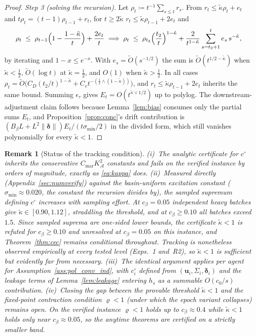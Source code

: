 \documentclass[11pt]{article}
\newtheorem{remark}[theorem]{Remark}
\newcommand{\Ot}{\widetilde{O}}
\begin{document}
\begin{proof}
\emph{Step 3 (solving the recursion).}  Let
$\rho_t\coloneqq t^{-1}\sum_{s\leq t}r_s$.  From
$r_t\leq\tilde\kappa\rho_t+e_t$ and
$t\rho_t=(t-1)\rho_{t-1}+r_t$, for $t\geq2\tilde\kappa$ $r_t\leq\tilde\kappa\rho_{t-1}+2e_t$ and
\[
\rho_t\;\leq\;\rho_{t-1}\Bigl(1-\frac{1-\tilde\kappa}{t}\Bigr)
+\frac{2e_t}{t}
\;\Longrightarrow\;
\rho_t\;\leq\;\rho_{t_2}\Bigl(\frac{t_2}{t}\Bigr)^{1-\tilde\kappa}
+\frac{2}{t^{1-\tilde\kappa}}\sum_{s=t_2+1}^{t}e_s\,s^{-\tilde\kappa},
\]
by iterating and $1-x\leq e^{-x}$.  With $e_s=\Ot(s^{-1/2})$ the sum is
$\Ot(t^{1/2-\tilde\kappa})$ when $\tilde\kappa<\tfrac12$,
$\Ot(\log t)$ at $\tilde\kappa=\tfrac12$, and $O(1)$ when
$\tilde\kappa>\tfrac12$. In all cases
$\rho_t=\Ot\bigl(C_D(t_2/t)^{1-\tilde\kappa}
+C_e t^{-(\frac12\wedge(1-\tilde\kappa))}\bigr)$, and
$r_t\leq\tilde\kappa\rho_{t-1}+2e_t$ inherits the same bound.  Summing
$\epsilon_\tau$ gives $E_t=O(t^{\tilde\kappa\vee1/2})$ up to polylog.
The downstream-adjustment claim follows because
Lemma~\ref{lem:bias} consumes only the partial sums $E_t$, and
Proposition~\ref{prop:conc}'s drift contribution is
$(B_\beta L+L^2\|\bm\delta\|)E_t/(t\sigma_{\min}/2)$ in the divided
form, which still vanishes polynomially for every $\tilde\kappa<1$.
\end{proof}

\begin{remark}[Status of the tracking condition]\label{rem:tracking_status}
(i)~The analytic certificate for $c^\circ$ inherits the conservative
$C_{\mathrm{mar}}K_{\mathcal A}^2$ constants and fails on the verified
instance by orders of magnitude, exactly as \eqref{eq:kappa} does.
(ii)~Measured directly (Appendix~\ref{sec:numverify}) against the
basin-uniform excitation constant ($\sigma_{\min}\approx0.020$, the
constant the recursion divides by), the sampled supremum defining
$c^\circ$ increases with sampling effort. At $c_\beta=0.05$
independent heavy batches give $\tilde\kappa\in[0.90,1.12]$,
straddling the threshold, and at $c_\beta\geq0.10$ all batches
exceed $1.5$.  Since sampled suprema are one-sided lower bounds, the
certificate $\tilde\kappa<1$ is \emph{refuted for
$c_\beta\geq0.10$ and unresolved at $c_\beta=0.05$} on this
instance, and
Theorem~\ref{thm:cec} remains conditional throughout. Tracking is
nonetheless observed empirically at every tested level (Exps.~1
and~R2), so $\tilde\kappa<1$ is sufficient but evidently far from
necessary.
(iii)~The identical argument applies per agent for
Assumption~\ref{ass:pol_conv_ind}, with $c^\circ_i$ defined from
$(\bm u_i,\Sigma_i,\bm\delta_i)$ and the leakage terms of
Lemma~\ref{lem:leakage} entering $h_s$ as a summable $O(c_0/s)$
contribution.  (iv)~Closing the gap between the provable threshold
$\tilde\kappa<1$ and the fixed-point contraction condition $\varrho<1$
(under which the epoch variant collapses) remains open. On the
verified instance $\varrho<1$ holds up to $c_\beta\approx0.4$ while
$\tilde\kappa<1$ holds only near $c_\beta\approx0.05$, so the anytime
theorems are certified on a strictly smaller band.
\end{remark}
\end{document}
